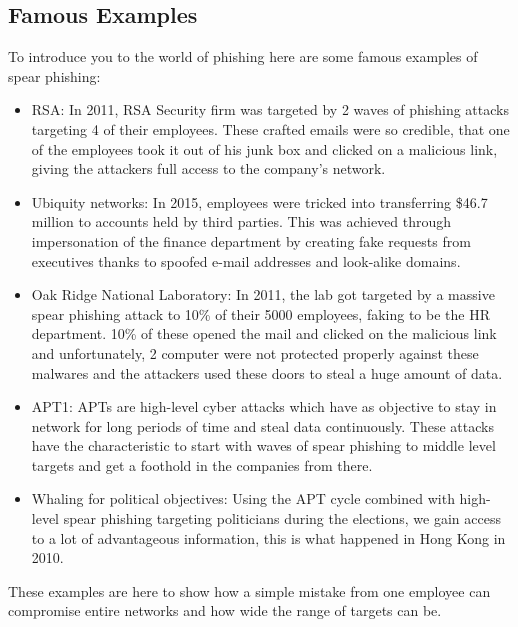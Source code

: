 \documentclass[12pt]{article} %
\begin{document}
\subsection{Famous Examples}
To introduce you to the world of phishing here are some famous examples of spear phishing:
\begin{itemize}
\item RSA: In 2011, RSA Security firm was targeted by 2 waves of phishing attacks targeting 4 of their employees. These crafted emails were so credible, that one of the employees took it out of his junk box and clicked on a malicious link, giving the attackers full access to the company's network. \cite{examples}
\item Ubiquity networks: In 2015, employees were tricked into transferring \$46.7 million to accounts held by third parties. This was achieved through impersonation of the finance department by creating fake requests from executives thanks to spoofed e-mail addresses and look-alike domains.\cite{examples}
\item Oak Ridge National Laboratory: In 2011, the lab got targeted by a massive spear phishing attack to 10\% of their 5000 employees, faking to be the HR department. 10\% of these opened the mail and clicked on the malicious link and unfortunately, 2 computer were not protected properly against these malwares and the attackers used these doors to steal a huge amount of data.\cite{labo example}
\item APT1: APTs are high-level cyber attacks which have as objective to stay in network for long periods of time and steal data continuously. These attacks have the characteristic to start with waves of spear phishing to middle level targets and get a foothold in the companies from there.\cite{APT,APT definition}
\item Whaling for political objectives: Using the APT cycle\cite{APT} combined with high-level spear phishing targeting politicians during the elections, we gain access to a lot of advantageous information, this is what happened in Hong Kong in 2010. \cite{whaling}
\end{itemize}
These examples are here to show how a simple mistake from one employee can compromise entire networks and how wide the range of targets can be.

\end{document}
